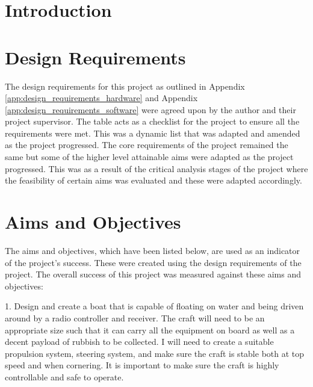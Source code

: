 \documentclass [11pt]{article}
\begin{document}
		
\newpage			
{}
\setcounter{page}{1}
\tableofcontents 
\newpage

\listoffigures
\listoftables
\lstlistoflistings
\printglossaries

\newpage
\section{Introduction}



\section{Design Requirements}

The design requirements for this project as outlined in Appendix \ref{app:design_requirements_hardware} and Appendix \ref{app:design_requirements_software} were agreed upon by the author and their project supervisor. The table acts as a checklist for the project to ensure all the requirements were met. This was a dynamic list that was adapted and amended as the project progressed. The core requirements of the project remained the same but some of the higher level attainable aims were adapted as the project progressed. This was as a result of the critical analysis stages of the project where the feasibility of certain aims was evaluated and these were adapted accordingly. 

\section{Aims and Objectives}

The aims and objectives, which have been listed below, are used as an indicator of the project's success. These were created using the design requirements of the project. The overall success of this project was measured against these aims and objectives: 

1.	Design and create a boat that is capable of floating on water and being driven around by a radio controller and receiver. The craft will need to be an appropriate size such that it can carry all the equipment on board as well as a decent payload of rubbish to be collected. I will need to create a suitable propulsion system, steering system, and make sure the craft is stable both at top speed and when cornering. It is important to make sure the craft is highly controllable and safe to operate. 
\end{document}
